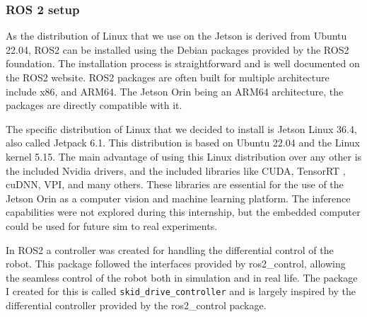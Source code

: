 \documentclass[12pt]{article}
\begin{document}
        \subsubsection{ROS 2 setup}
        
        As the distribution of Linux that we use on the Jetson is derived from Ubuntu 22.04, ROS2 can be installed using the Debian packages provided by the ROS2 foundation. The installation process is straightforward \cite{ros2_installation} and is well documented on the ROS2 website. ROS2 packages are often built for multiple architecture include x86, and ARM64. The Jetson Orin being an ARM64 architecture, the packages are directly compatible with it. 

        The specific distribution of Linux that we decided to install is Jetson Linux 36.4, also called Jetpack 6.1. This distribution is based on Ubuntu 22.04 and the Linux kernel 5.15. The main advantage of using this Linux distribution over any other is the included Nvidia drivers, and the included libraries like CUDA\cite{cuda}, TensorRT \cite{tensorrt}, cuDNN\cite{cudnn}, VPI, and many others. These libraries are essential for the use of the Jetson Orin as a computer vision and machine learning platform. The inference capabilities were not explored during this internship, but the embedded computer could be used for future sim to real \cite{peng2018sim} experiments. 

        In ROS2 a controller was created for handling the differential control of the robot. This package followed the interfaces provided by ros2\_control, allowing the seamless control of the robot both in simulation and in real life. The package I created for this is called \texttt{skid\_drive\_controller} and is largely inspired by the differential controller provided by the ros2\_control package.
        
\end{document}
